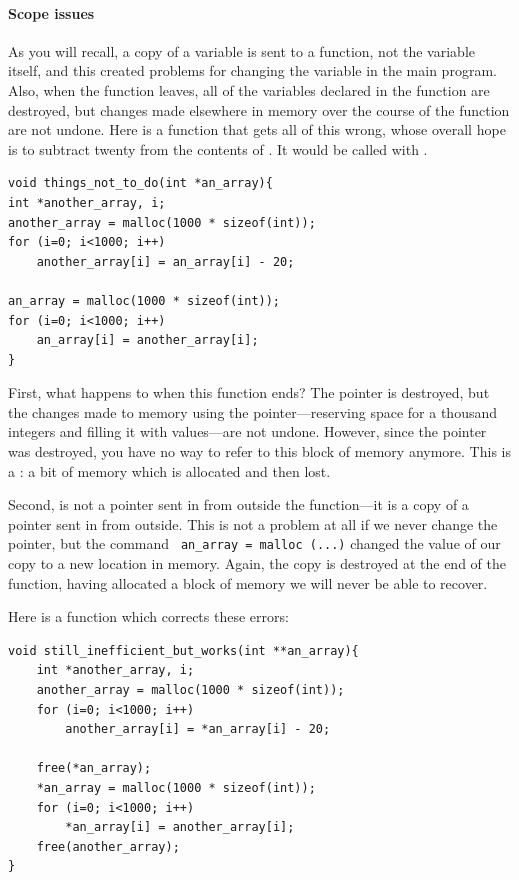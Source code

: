 \documentclass[12pt]{article}
\begin{document}
\paragraph{Scope issues} As you will recall, a copy of a variable is sent to a function, not the variable
itself, and this created problems for changing the variable in the main program. Also, when the function
leaves, all of the variables declared in the function are destroyed,
but changes made elsewhere in memory over the course of the function
are not undone. Here is a function that gets all of this wrong, whose overall hope is to subtract twenty
from the contents of . It would be called with .
\begin{lstlisting}
void things_not_to_do(int *an_array){
int *another_array, i;
another_array = malloc(1000 * sizeof(int));
for (i=0; i<1000; i++)
    another_array[i] = an_array[i] - 20;

an_array = malloc(1000 * sizeof(int));
for (i=0; i<1000; i++)
    an_array[i] = another_array[i];
}
\end{lstlisting}

First, what happens to  when this function
ends? The pointer is destroyed, but the changes made to memory using
the pointer---reserving space for a thousand integers and filling it
with values---are not undone. However, since the pointer was destroyed,
you have no way to refer to this block of memory anymore.  This is a
: a bit of memory which is allocated and then lost.

Second,  is not a pointer sent in from outside the
function---it is a copy of a pointer sent in from outside. This is not
a problem at all if we never change the pointer, but the command {\tt
an\_array = malloc (...)} changed the value of our copy 
to a new location in memory.  Again, the copy is destroyed at the end
of the function, having allocated a block of memory we will never be
able to recover.

Here is a function which corrects these errors:

\begin{lstlisting}
void still_inefficient_but_works(int **an_array){
    int *another_array, i;
    another_array = malloc(1000 * sizeof(int));
    for (i=0; i<1000; i++)
        another_array[i] = *an_array[i] - 20;

    free(*an_array);
    *an_array = malloc(1000 * sizeof(int));
    for (i=0; i<1000; i++)
        *an_array[i] = another_array[i];
    free(another_array);
}
\end{lstlisting}
\end{document}
